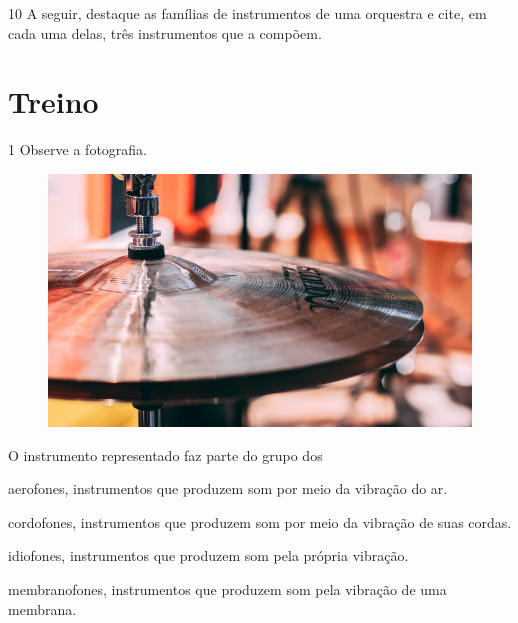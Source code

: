 \num{10} A seguir, destaque as famílias de instrumentos de uma orquestra e
cite, em cada uma delas, três instrumentos que a compõem.


\pagebreak
\section{Treino}

\num{1}  Observe a fotografia.

\begin{figure}[htpb!]
\includegraphics[width=\textwidth]{./media/image1.png}
\end{figure}

O instrumento representado faz parte do grupo dos

\begin{escolha}
\item
  aerofones, instrumentos que produzem som por meio da vibração do ar.
\item
  cordofones, instrumentos que produzem som por meio da vibração de suas
  cordas.
\item
  idiofones, instrumentos que produzem som pela própria vibração.
\item
  membranofones, instrumentos que produzem som pela vibração de uma
  membrana.
\end{escolha}

